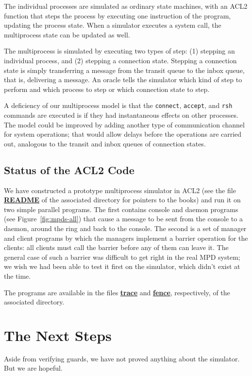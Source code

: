 \documentclass{article}
\newcommand{\link}[1]{\underline{\bfseries #1}}
\begin{document}
The individual processes are simulated as ordinary state machines,
with an ACL2 function that steps the process by executing one
instruction of the program, updating the process state.  When a
simulator executes a system call, the multiprocess state can be
updated as well.

The multiprocess is simulated by executing two types of step:
(1) stepping an individual process, and
(2) stepping a connection state.
Stepping a connection state is simply
transferring a message from the transit queue to the inbox queue,
that is, delivering a message.  An oracle tells the simulator
which kind of step to perform and which process to step or
which connection state to step.

A deficiency of our multiprocess model is that the {\tt connect}, {\tt accept},
and {\tt rsh} commands are executed is if they had instantaneous effects
on other processes.  The model could be improved by adding another
type of communication channel for system operations; that would
allow delays before the operations are carried out, analogous
to the transit and inbox queues of connection states.

\subsection{Status of the ACL2 Code}

We have constructed a prototype multiprocess simulator in ACL2
(see the file \link{README} of the associated directory
for pointers to the books)
and run it on two simple parallel programs.
The first contains console and daemon programs (see Figure~\ref{fig:mpds-all})
that cause a message to be sent from the console to a daemon, around the ring
and back to the console.  The second is a set of manager and client programs
by which the managers implement a barrier operation for the clients:  all
clients must call the barrier before any of them can leave it.  The general
case of such a barrier was difficult to get right in the real MPD system;  we
wish we had been able to test it first on the simulator, which didn't exist at
the time. 

The programs are available in the files \link{trace} and
\link{fence}, respectively, of the associated directory.

\section{The Next Steps}

Aside from verifying guards, we have not proved anything about
the simulator.  But we are hopeful.
\end{document}
